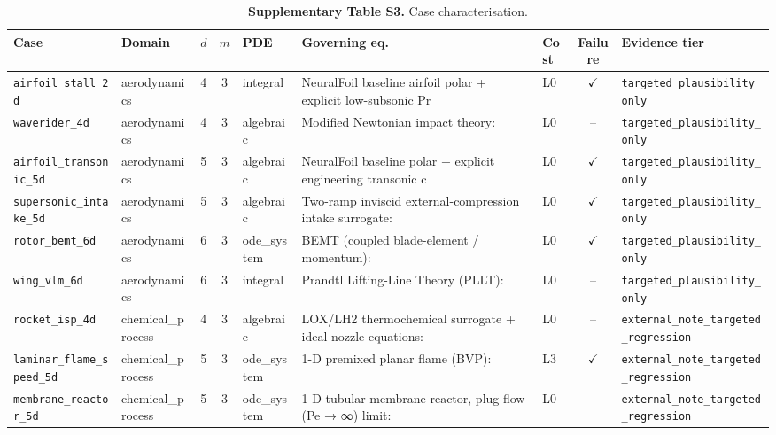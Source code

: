 \begin{table}[htbp]
\centering
\caption{\textbf{Supplementary Table S3.} Case characterisation.}
\label{tab:si_cases}
\footnotesize
\setlength{\tabcolsep}{3pt}
\begin{tabular}{@{}llcclllcl@{}}
\toprule
\textbf{Case} & \textbf{Domain} & $d$ & $m$ & \textbf{PDE} & \textbf{Governing eq.} & \textbf{Cost} & \textbf{Failure} & \textbf{Evidence tier} \\
\midrule
\texttt{airfoil\_stall\_2d} & aerodynamics & 4 & 3 & integral & NeuralFoil baseline airfoil polar + explicit low-subsonic Pr & L0 & $\checkmark$ & \texttt{targeted\_plausibility\_only} \\
\texttt{waverider\_4d} & aerodynamics & 4 & 3 & algebraic & Modified Newtonian impact theory: & L0 & -- & \texttt{targeted\_plausibility\_only} \\
\texttt{airfoil\_transonic\_5d} & aerodynamics & 5 & 3 & algebraic & NeuralFoil baseline polar + explicit engineering transonic c & L0 & $\checkmark$ & \texttt{targeted\_plausibility\_only} \\
\texttt{supersonic\_intake\_5d} & aerodynamics & 5 & 3 & algebraic & Two-ramp inviscid external-compression intake surrogate: & L0 & $\checkmark$ & \texttt{targeted\_plausibility\_only} \\
\texttt{rotor\_bemt\_6d} & aerodynamics & 6 & 3 & ode\_system & BEMT (coupled blade-element / momentum): & L0 & $\checkmark$ & \texttt{targeted\_plausibility\_only} \\
\texttt{wing\_vlm\_6d} & aerodynamics & 6 & 3 & integral & Prandtl Lifting-Line Theory (PLLT): & L0 & -- & \texttt{targeted\_plausibility\_only} \\
\texttt{rocket\_isp\_4d} & chemical\_process & 4 & 3 & algebraic & LOX/LH2 thermochemical surrogate + ideal nozzle equations: & L0 & -- & \texttt{external\_note\_targeted\_regression} \\
\texttt{laminar\_flame\_speed\_5d} & chemical\_process & 5 & 3 & ode\_system & 1-D premixed planar flame (BVP): & L3 & $\checkmark$ & \texttt{external\_note\_targeted\_regression} \\
\texttt{membrane\_reactor\_5d} & chemical\_process & 5 & 3 & ode\_system & 1-D tubular membrane reactor, plug-flow (Pe → ∞) limit: & L0 & -- & \texttt{external\_note\_targeted\_regression} \\

\end{tabular}
\end{table}
